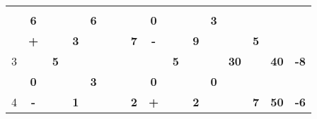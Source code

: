 \documentclass[a4paper, 12pt]{article}
\begin{document}
\begin{table}[H]
\begin{tabular}{|c|cccc|cccc|cccc|cccc|rr|}
          &       & \multicolumn{2}{c}{} &       &       & \multicolumn{2}{c}{} &       &       & \multicolumn{2}{c}{} &       &       & \multicolumn{2}{c}{} &       & \multicolumn{1}{c|}{} &  \bigstrut[b]\\
\cline{2-2}\cline{6-6}\cline{10-10}\cline{14-14}          & \multicolumn{1}{c|}{\textbf{6}} &       &       &       & \multicolumn{1}{c|}{\textbf{6}} &       &       &       & \multicolumn{1}{c|}{\textbf{0}} &       &       &       & \multicolumn{1}{c|}{\textbf{3}} & \multicolumn{2}{c}{} &       & \multicolumn{1}{c|}{} &  \bigstrut\\
    \hline
    \multirow{4}[6]{*}{3} & \multicolumn{1}{c|}{\cellcolor[rgb]{ 1,  0,  0}\textbf{+}} &       & \multicolumn{1}{r|}{} & \cellcolor[rgb]{ 0,  .69,  .314}\textbf{3} &       &       & \multicolumn{1}{r|}{} & \textbf{7} & \multicolumn{1}{c|}{\cellcolor[rgb]{ 1,  0,  0}\textbf{-}} & \multicolumn{2}{c|}{} & \cellcolor[rgb]{ 0,  .69,  .314}\textbf{9} &       &       & \multicolumn{1}{r|}{} & \cellcolor[rgb]{ 1,  .753,  0}\textbf{5} & \multicolumn{1}{c|}{\multirow{4}[6]{*}{\textbf{40}}} & \multicolumn{1}{c|}{\multirow{4}[6]{*}{\textbf{-8}}} \bigstrut\\
\cline{2-2}\cline{5-5}\cline{9-10}\cline{13-13}\cline{17-17}          &       & \multicolumn{2}{c}{\multirow{2}[2]{*}{\textbf{5}}} &       &       & \multicolumn{2}{c}{\multirow{2}[2]{*}{}} & \multirow{3}[4]{*}{} &       & \multicolumn{2}{c}{\multirow{2}[2]{*}{\textbf{5}}} &       &       & \multicolumn{2}{c}{\multirow{2}[2]{*}{\textbf{30}}} &       & \multicolumn{1}{c|}{} &  \bigstrut[t]\\
          &       & \multicolumn{2}{c}{} &       &       & \multicolumn{2}{c}{} &       &       & \multicolumn{2}{c}{} &       &       & \multicolumn{2}{c}{} &       & \multicolumn{1}{c|}{} &  \bigstrut[b]\\
\cline{2-2}\cline{6-6}\cline{10-10}\cline{14-14}          & \multicolumn{1}{c|}{\textbf{0}} & \multicolumn{2}{c}{} &       & \multicolumn{1}{c|}{\textbf{3}} & \multicolumn{2}{c}{} &       & \multicolumn{1}{c|}{\textbf{0}} &       &       &       & \multicolumn{1}{c|}{\textbf{0}} & \multicolumn{2}{c}{} &       & \multicolumn{1}{c|}{} &  \bigstrut\\
    \hline
    \multirow{4}[6]{*}{4} & \multicolumn{1}{c|}{\cellcolor[rgb]{ 1,  0,  0}\textbf{-}} &       & \multicolumn{1}{r|}{} & \cellcolor[rgb]{ 0,  .69,  .314}\textbf{1} &       &       & \multicolumn{1}{r|}{} & \cellcolor[rgb]{ 1,  .753,  0}\textbf{2} & \multicolumn{1}{c|}{\cellcolor[rgb]{ 1,  0,  0}\textbf{+}} &       & \multicolumn{1}{r|}{} & \cellcolor[rgb]{ 1,  1,  0}\textbf{2} &       &       & \multicolumn{1}{r|}{} & \textbf{7} & \multicolumn{1}{c|}{\multirow{4}[6]{*}{\textbf{50}}} & \multicolumn{1}{c|}{\multirow{4}[6]{*}{\textbf{-6}}} \bigstrut\\

\end{tabular}
\end{table}
\end{document}
